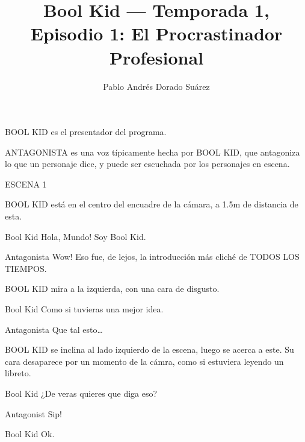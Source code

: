 \documentclass{screenplay}[2018/01/07]
\title{Bool Kid — Temporada 1, Episodio 1: El Procrastinador Profesional}
\author{Pablo Andrés Dorado Suárez}
\begin{document}
    \coverpage

    \fadein
    BOOL KID es el presentador del programa.

    ANTAGONISTA es una voz típicamente hecha por BOOL KID, que antagoniza lo que
    un personaje dice, y puede ser escuchada por los personajes en escena.

    \vspace{1em}
    \begin{center}
        ESCENA 1
    \end{center}
    \vspace{2em}


    BOOL KID está en el centro del encuadre de la cámara, a 1.5m de distancia de
    esta.

    \begin{dialogue}{Bool Kid}
        Hola, Mundo! Soy Bool Kid.
    \end{dialogue}

    \begin{dialogue}{Antagonista}
        Wow! Eso fue, de lejos, la introducción más cliché de TODOS LOS TIEMPOS.
    \end{dialogue}

    BOOL KID mira a la izquierda, con una cara de disgusto.

    \begin{dialogue}{Bool Kid}
        Como si tuvieras una mejor idea.
    \end{dialogue}

    \begin{dialogue}{Antagonista}
        Que tal esto\dots
    \end{dialogue}

    BOOL KID se inclina al lado izquierdo de la escena, luego se acerca a este.
    Su cara desaparece por un momento de la cámra, como si estuviera leyendo un
    libreto.

    \begin{dialogue}{Bool Kid}
        ¿De veras quieres que diga eso?
    \end{dialogue}

    \begin{dialogue}{Antagonist}
        Sip!
    \end{dialogue}

    \begin{dialogue}[sighing]{Bool Kid}
        Ok.
    \end{dialogue}
\end{document}
